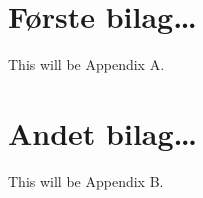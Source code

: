\documentclass[
]{book}
\begin{document}
\hypertarget{appendix-bilag}{%
\appendix}


\hypertarget{bilag1}{%
\chapter{Første bilag\ldots{}}\label{bilag1}}

This will be Appendix A.

\hypertarget{bilag2}{%
\chapter{Andet bilag\ldots{}}\label{bilag2}}

This will be Appendix B.
\end{document}
